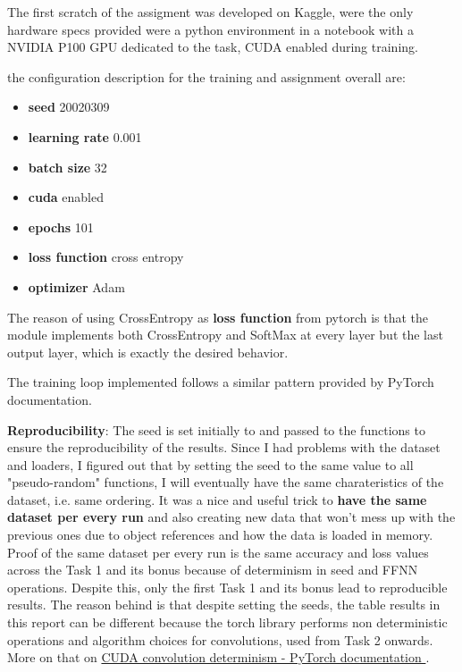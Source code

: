\documentclass[11pt]{scrartcl}
\begin{document}
The first scratch of the assigment was developed on Kaggle, were the only hardware specs 
provided were a python environment in a notebook with a NVIDIA P100 GPU dedicated to the task,
CUDA enabled during training.

the configuration description for the training and assignment overall are:

\begin{itemize}
	\item \textbf{seed} 20020309 
	\item \textbf{learning rate} 0.001
	\item \textbf{batch size} 32
	\item \textbf{cuda} enabled
	\item \textbf{epochs} 101
	\item \textbf{loss function} cross entropy 
	\item \textbf{optimizer} Adam
\end{itemize}

The reason of using CrossEntropy as \textbf{loss function} from pytorch is that the 
module implements both CrossEntropy and SoftMax at every layer but the last output layer,
which is exactly the desired behavior.

The training loop implemented follows a similar pattern provided by PyTorch documentation.

\textbf{Reproducibility}:
The seed is set initially to 
and passed to the functions
to ensure the reproducibility of the results.
Since I had problems with the dataset and loaders, 
I figured out that by setting the seed to the same value
to all "pseudo-random" functions,
I will eventually have the same charateristics of the dataset, 
i.e. same ordering.
It was a nice and useful trick to \textbf{have the same dataset per every run}
and also creating new data that won't mess up with the previous ones due to 
object references and how the data is loaded in memory.
Proof of the same dataset per every run is the same accuracy and loss values
across the Task 1 and its bonus because of determinism in seed and FFNN operations.
Despite this, only the first Task 1 and its bonus lead to 
reproducible results.
The reason behind is that despite setting the seeds, 
the table results in this report can be different because
the torch library performs non deterministic operations
and algorithm choices for convolutions, used from Task 2 onwards.
More on that on \href{https://pytorch.org/docs/stable/notes/randomness.html}{
	CUDA convolution determinism - PyTorch documentation
}.
\end{document}
